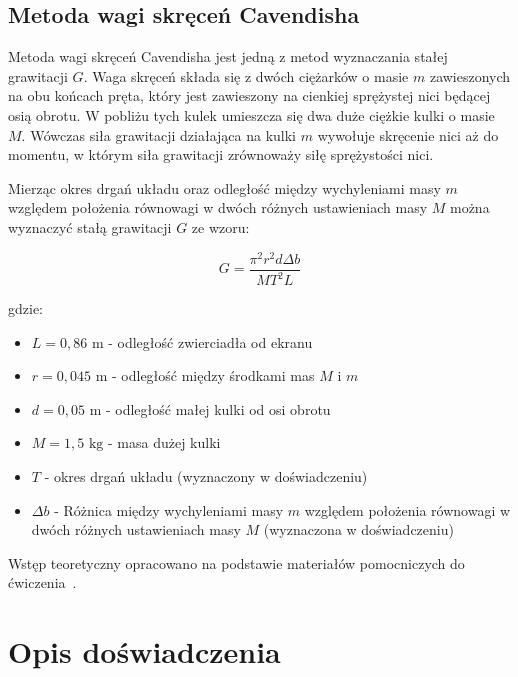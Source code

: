 \documentclass[a4paper,12pt]{article}
\begin{document}
\subsection*{Metoda wagi skręceń Cavendisha}

Metoda wagi skręceń Cavendisha jest jedną z metod wyznaczania stałej grawitacji $G$. Waga skręceń składa się z dwóch ciężarków o masie $m$ zawieszonych na obu końcach pręta, który jest zawieszony na cienkiej sprężystej nici będącej osią obrotu. W pobliżu tych kulek umieszcza się dwa duże ciężkie kulki o masie $M$. Wówczas siła grawitacji działająca na kulki $m$ wywołuje skręcenie nici aż do momentu, w którym siła grawitacji zrównoważy siłę sprężystości nici.

Mierząc okres drgań układu oraz odległość między wychyleniami masy $m$ względem położenia równowagi w dwóch różnych ustawieniach masy $M$ można wyznaczyć stałą grawitacji $G$ ze wzoru:

\begin{equation}
    \label{eq:g_cavendish}
    G = \frac{\pi^2 r^2 d \Delta b}{MT^2 L}
\end{equation}

gdzie:
\begin{itemize}
    \setlength{\itemsep}{0em}
    \item $L = 0,86\text{ m}$ - odległość zwierciadła od ekranu 
    \item $r = 0,045\text{ m}$ - odległość między środkami mas $M$ i $m$
    \item $d = 0,05\text{ m}$ - odległość małej kulki od osi obrotu
    \item $M = 1,5\text{ kg}$ - masa dużej kulki
    \item $T$ - okres drgań układu (wyznaczony w doświadczeniu)
    \item $\Delta b$ - Różnica między wychyleniami masy $m$ względem położenia równowagi w dwóch różnych ustawieniach masy $M$ (wyznaczona w doświadczeniu)
\end{itemize}


Wstęp teoretyczny opracowano na podstawie materiałów pomocniczych do ćwiczenia~\cite{materialy_pomoc_19}.


\section{Opis doświadczenia}
\end{document}
